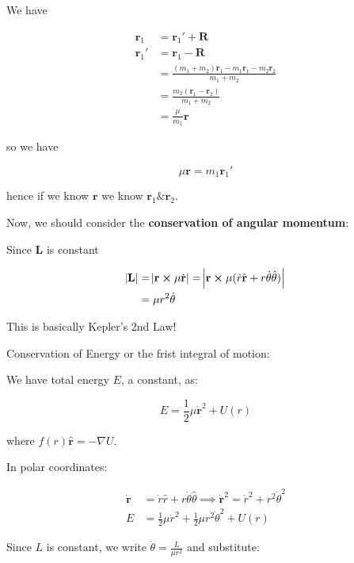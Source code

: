 We have

\begin{align}
	\mathbf{r}_1 &= \mathbf{r}_1' + \mathbf{R}\\
	\textbf{r}_1' &= \textbf{r}_1 - \mathbf{R}\\
	&= \frac{(m_1 + m_2) \mathbf{r}_1 - m_1 \mathbf{r}_1 - m_2 \mathbf{r}_2}{m_1 + m_2}\\
	&= \frac{m_2 (\mathbf{r}_1 - \mathbf{r}_2)}{m_1 + m_2}\\
	&= \frac{\mu}{m_1} \mathbf{r}
\end{align}

so we have

\begin{equation}
	\mu \mathbf{r} = m_1 \mathbf{r}_1'
\end{equation}

hence if we know $\mathbf{r}$ we know $\mathbf{r}_1 \& \mathbf{r}_2$.

Now, we should consider the \textbf{conservation of angular momentum}:


Since $\mathbf{L}$ is constant

\begin{align}
	\abs{\mathbf{L}} &= \abs{\mathbf{r} \cross \mu \dot{\mathbf{r}}} = \abs{\mathbf{r} \cross \mu (\dot r \hat{\mathbf{r}} + r \dot\theta \hat{\mathbf{\theta}})}\\
	&= \mu r^2 \dot \theta
\end{align}

This is basically Kepler's 2nd Law!

Conservation of Energy or the frist integral of motion:

We have total energy $E$, a constant, as:

\begin{equation}
	E = \frac{1}{2} \mu \dot{\mathbf{r}}^2 + U(r)
\end{equation}

where $f(r) \hat{\mathbf{r}} = - \nabla U$.

In polar coordinates:

\begin{align}
	\dot{\mathbf{r}} &= \dot r \hat r + r \dot\theta \hat\theta \implies \dot{\mathbf{r}}^2 = \dot r^2 + r^2 \dot \theta^2\\
	E &= \frac{1}{2} \mu \dot r^2 + \frac{1}{2}\mu r^2 \dot\theta^2 + U(r)
\end{align}

Since $L$ is constant, we write $\dot \theta = \frac{L}{\mu r^2}$ and substitute:

